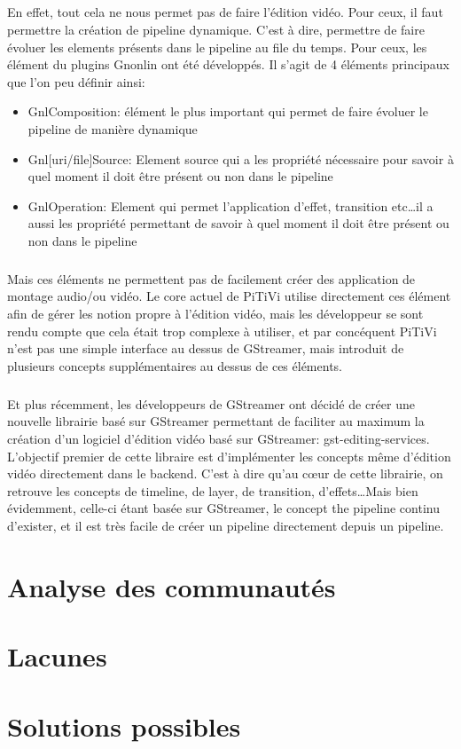 \subparagraph{}

En effet, tout cela ne nous permet pas de faire l'édition vidéo. Pour
ceux, il faut permettre la création de pipeline dynamique. C'est
à dire, permettre de faire évoluer les elements présents dans le
pipeline au file du temps.  Pour ceux, les élément du plugins Gnonlin
ont été développés. Il s'agit de 4 éléments principaux que l'on
peu définir ainsi:

\begin{itemize}

  \item {GnlComposition: élément le plus important qui permet de
  faire évoluer
    le pipeline de manière dynamique}

  \item{Gnl[uri/file]Source: Element source qui a les propriété
    nécessaire pour savoir à quel moment il doit être présent ou
    non dans le pipeline}

  \item{GnlOperation: Element qui permet l'application d'effet, transition
    etc\ldots il a aussi les propriété permettant de savoir à quel
    moment il doit être présent ou non dans le pipeline}

\end{itemize}

\subparagraph{}

Mais ces éléments ne permettent pas de facilement créer des application
de montage audio/ou vidéo. Le core actuel de PiTiVi utilise directement
ces élément afin de gérer les notion propre à l'édition vidéo,
mais les développeur se sont rendu compte que cela était trop complexe
à utiliser, et par concéquent PiTiVi n'est pas une simple interface au
dessus de GStreamer, mais introduit de plusieurs concepts supplémentaires
au dessus de ces éléments.

\subparagraph{}

Et plus récemment, les développeurs de GStreamer ont décidé de créer
une nouvelle librairie basé sur GStreamer permettant de faciliter
au maximum la création d'un logiciel d'édition vidéo basé sur
GStreamer: gst-editing-services.  L'objectif premier de cette libraire
est d'implémenter les concepts même d'édition vidéo directement dans
le backend. C'est à dire qu'au cœur de cette librairie, on retrouve
les concepts de timeline, de layer, de transition, d'effets\ldots Mais
bien évidemment, celle-ci étant basée sur GStreamer, le concept the
pipeline continu d'exister, et il est très facile de créer un pipeline
directement depuis un pipeline.


\newpage \section{Analyse des communautés}

\newpage \section{Lacunes}

\newpage \section{Solutions possibles}
